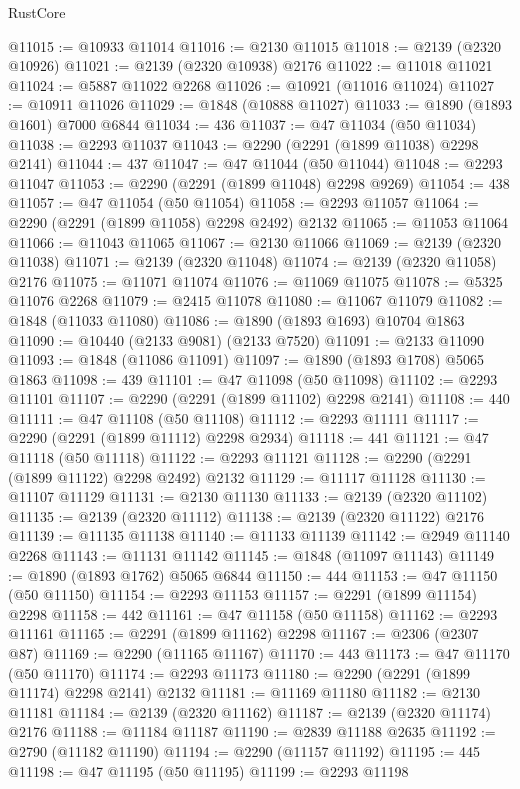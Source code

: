 \begin{lexlean}{RustCore}
\begin{coremodule}
@11015 := @10933 @11014
@11016 := @2130 @11015
@11018 := @2139 (@2320 @10926)
@11021 := @2139 (@2320 @10938) @2176
@11022 := @11018 @11021
@11024 := @5887 @11022 @2268
@11026 := @10921 (@11016 @11024)
@11027 := @10911 @11026
@11029 := @1848 (@10888 @11027)
@11033 := @1890 (@1893 @1601) @7000 @6844
@11034 := 436
@11037 := @47 @11034 (@50 @11034)
@11038 := @2293 @11037
@11043 := @2290 (@2291 (@1899 @11038) @2298 @2141)
@11044 := 437
@11047 := @47 @11044 (@50 @11044)
@11048 := @2293 @11047
@11053 := @2290 (@2291 (@1899 @11048) @2298 @9269)
@11054 := 438
@11057 := @47 @11054 (@50 @11054)
@11058 := @2293 @11057
@11064 := @2290 (@2291 (@1899 @11058) @2298 @2492) @2132
@11065 := @11053 @11064
@11066 := @11043 @11065
@11067 := @2130 @11066
@11069 := @2139 (@2320 @11038)
@11071 := @2139 (@2320 @11048)
@11074 := @2139 (@2320 @11058) @2176
@11075 := @11071 @11074
@11076 := @11069 @11075
@11078 := @5325 @11076 @2268
@11079 := @2415 @11078
@11080 := @11067 @11079
@11082 := @1848 (@11033 @11080)
@11086 := @1890 (@1893 @1693) @10704 @1863
@11090 := @10440 (@2133 @9081) (@2133 @7520)
@11091 := @2133 @11090
@11093 := @1848 (@11086 @11091)
@11097 := @1890 (@1893 @1708) @5065 @1863
@11098 := 439
@11101 := @47 @11098 (@50 @11098)
@11102 := @2293 @11101
@11107 := @2290 (@2291 (@1899 @11102) @2298 @2141)
@11108 := 440
@11111 := @47 @11108 (@50 @11108)
@11112 := @2293 @11111
@11117 := @2290 (@2291 (@1899 @11112) @2298 @2934)
@11118 := 441
@11121 := @47 @11118 (@50 @11118)
@11122 := @2293 @11121
@11128 := @2290 (@2291 (@1899 @11122) @2298 @2492) @2132
@11129 := @11117 @11128
@11130 := @11107 @11129
@11131 := @2130 @11130
@11133 := @2139 (@2320 @11102)
@11135 := @2139 (@2320 @11112)
@11138 := @2139 (@2320 @11122) @2176
@11139 := @11135 @11138
@11140 := @11133 @11139
@11142 := @2949 @11140 @2268
@11143 := @11131 @11142
@11145 := @1848 (@11097 @11143)
@11149 := @1890 (@1893 @1762) @5065 @6844
@11150 := 444
@11153 := @47 @11150 (@50 @11150)
@11154 := @2293 @11153
@11157 := @2291 (@1899 @11154) @2298
@11158 := 442
@11161 := @47 @11158 (@50 @11158)
@11162 := @2293 @11161
@11165 := @2291 (@1899 @11162) @2298
@11167 := @2306 (@2307 @87)
@11169 := @2290 (@11165 @11167)
@11170 := 443
@11173 := @47 @11170 (@50 @11170)
@11174 := @2293 @11173
@11180 := @2290 (@2291 (@1899 @11174) @2298 @2141) @2132
@11181 := @11169 @11180
@11182 := @2130 @11181
@11184 := @2139 (@2320 @11162)
@11187 := @2139 (@2320 @11174) @2176
@11188 := @11184 @11187
@11190 := @2839 @11188 @2635
@11192 := @2790 (@11182 @11190)
@11194 := @2290 (@11157 @11192)
@11195 := 445
@11198 := @47 @11195 (@50 @11195)
@11199 := @2293 @11198

\end{coremodule}
\end{lexlean}
